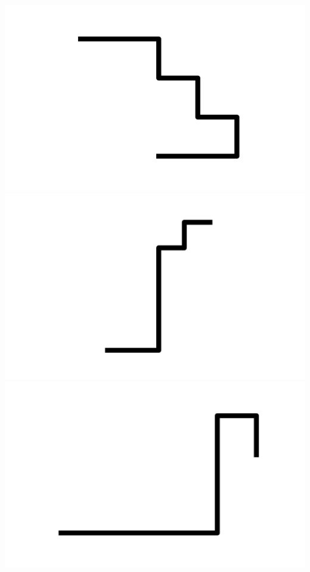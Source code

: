 \documentclass[]{report}
\begin{document}
\includegraphics[scale=.1]{pictures/21/state_cluster_shapes_115.pdf} 
\includegraphics[scale=.1]{pictures/21/state_cluster_shapes_116.pdf} 
\includegraphics[scale=.1]{pictures/21/state_cluster_shapes_117.pdf} 
\end{document}
